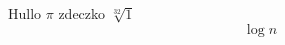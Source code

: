 \documentclass{article}
\begin{document}
Hullo $\pi$ zdeczko $\sqrt[32]{1}$
\[\log n\]

\end{document}
